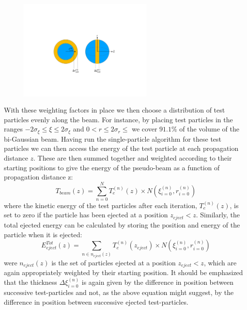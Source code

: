 \begin{figure}
\centering
\includegraphics[width=0.6\textwidth]{AnnularCrosssSection}
\end{figure}
With these weighting factors in place we then choose a distribution of test particles evenly along the beam. For instance, by placing test particles in the ranges $-2\sigma_{\xi}\leq\xi\leq 2\sigma_{\xi}$ and $0<r\leq2\sigma_r\leq$ we cover $91.1\%$ of the volume of the bi-Gaussian beam. Having run the single-particle algorithm for these test particles we can then access the energy of the test particle at each propagation distance $z$. These are then summed together and weighted according to their starting positions to give the energy of the pseudo-beam as a function of propagation distance z:
\begin{equation}
T_{beam}(z)= \sum_{n=0}^N T_e^{(n)}(z)\times N\left(\xi_{i=0}^{(n)},r_{i=0}^{(n)}\right)
\end{equation}
where the kinetic energy of the test particles after each iteration, $T_e^{(n)}(z)$, is set to zero if the particle has been ejected at a position $z_{eject}<z$. Similarly, the total ejected energy can be calculated by storing the position and energy of the particle when it is ejected:
\begin{equation}
E^{Tot}_{eject}(z)=\sum_{n\in n_{eject}(z)} T_e^{(n)}(z_{eject})\times N\left(\xi_{i=0}^{(n)},r_{i=0}^{(n)}\right)
\end{equation}
were $n_{eject}(z)$ is the set of particles ejected at a position $z_{eject}<z$, which are again appropriately weighted by their starting position. It should be emphasized that the thickness $\Delta \xi_{i=0}^{(n)}$ is again given by the difference in position between successive test-particles and not, as the above equation might suggest, by the difference in position between successive ejected test-particles. \\
